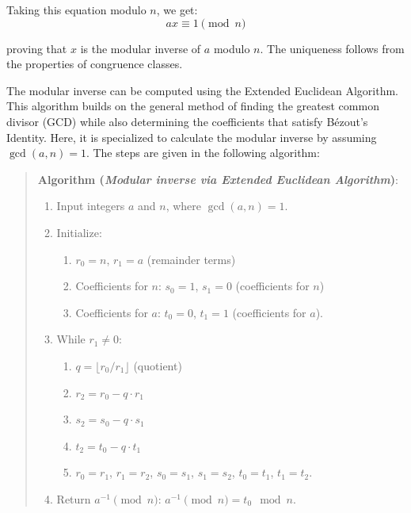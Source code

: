 \documentclass[
  letterpaper,
  DIV=11,
  numbers=noendperiod,
  oneside]{scrartcl}
\providecommand{\tightlist}{%
  \setlength{\itemsep}{0pt}\setlength{\parskip}{0pt}}\usepackage{longtable,booktabs,array}
\begin{document}
Taking this equation modulo \(n\), we get: \[
ax \equiv 1 \pmod{n}
\]

proving that \(x\) is the modular inverse of \(a\) modulo \(n\). The
uniqueness follows from the properties of congruence classes.

The modular inverse can be computed using the Extended Euclidean
Algorithm. This algorithm builds on the general method of finding the
greatest common divisor (GCD) while also determining the coefficients
that satisfy Bézout's Identity. Here, it is specialized to calculate the
modular inverse by assuming \(\gcd(a, n) = 1\). The steps are given in
the following algorithm:

\begin{quote}
\textbf{Algorithm (\emph{Modular inverse via Extended Euclidean
Algorithm})}:

\begin{enumerate}
\def\labelenumi{\arabic{enumi}.}
\item
  Input integers \(a\) and \(n\), where \(\gcd(a, n) = 1\).
\item
  Initialize:

  \begin{enumerate}
  \def\labelenumii{\arabic{enumii}.}
  \tightlist
  \item
    \(r_0 = n\), \(r_1 = a\) (remainder terms)
  \item
    Coefficients for \(n\): \(s_0 = 1\), \(s_1 = 0\) (coefficients for
    \(n\))
  \item
    Coefficients for \(a\): \(t_0 = 0\), \(t_1 = 1\) (coefficients for
    \(a\)).
  \end{enumerate}
\item
  While \(r_1 \neq 0\):

  \begin{enumerate}
  \def\labelenumii{\arabic{enumii}.}
  \tightlist
  \item
    \(q = \lfloor r_0 / r_1 \rfloor\) (quotient)
  \item
    \(r_2 = r_0 - q \cdot r_1\)
  \item
    \(s_2 = s_0 - q \cdot s_1\)
  \item
    \(t_2 = t_0 - q \cdot t_1\)
  \item
    \(r_0 = r_1\), \(r_1 = r_2\), \(s_0 = s_1\), \(s_1 = s_2\),
    \(t_0 = t_1\), \(t_1 = t_2\).
  \end{enumerate}
\item
  Return \(a^{-1} \pmod{n}\): \(a^{-1} \pmod{n} = t_0 \mod n\).
\end{enumerate}
\end{quote}
\end{document}
